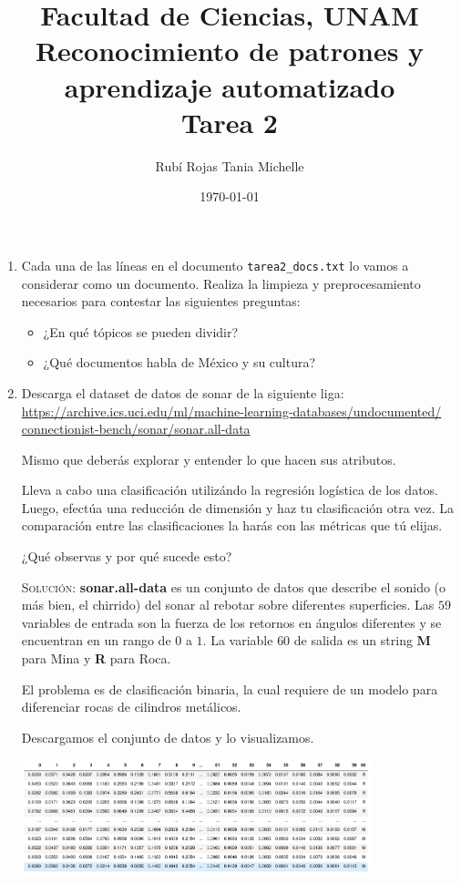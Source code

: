 \documentclass[letterpaper,11pt]{article}
\title{Facultad de Ciencias, UNAM \\ 
       Reconocimiento de patrones y aprendizaje automatizado \\ 
       Tarea 2}
\author{Rubí Rojas Tania Michelle}
\date{\today}
\begin{document}
\maketitle

\begin{enumerate}
    \item Cada una de las líneas en el documento \texttt{tarea2\_docs.txt} lo 
    vamos a considerar como un documento. Realiza la limpieza y preprocesamiento 
    necesarios para contestar las siguientes preguntas:
    \begin{itemize}
        \item ¿En qué tópicos se pueden dividir?

        \item ¿Qué documentos habla de México y su cultura?
    \end{itemize}

    \item Descarga el dataset de datos de sonar de la siguiente liga:
    \url{https://archive.ics.uci.edu/ml/machine-learning-databases/undocumented/
    connectionist-bench/sonar/sonar.all-data}

    Mismo que deberás explorar y entender lo que hacen sus atributos. 
    
    Lleva a cabo una clasificación utilizándo la regresión logística de los 
    datos. Luego, efectúa una reducción de dimensión y haz tu clasificación 
    otra vez. La comparación entre las clasificaciones la harás con las 
    métricas que tú elijas. 

    ¿Qué observas y por qué sucede esto?

    \textsc{Solución:} \textbf{sonar.all-data} es un conjunto de datos que 
    describe el sonido (o más bien, el chirrido) del sonar al rebotar sobre 
    diferentes superficies. Las $59$ variables de entrada son la fuerza de los 
    retornos en ángulos diferentes y se encuentran en un rango de $0$ a $1$. La 
    variable $60$ de salida es un string \textbf{M} para Mina y \textbf{R} para 
    Roca.

    El problema es de clasificación binaria, la cual requiere de un modelo para 
    diferenciar rocas de cilindros metálicos.

    Descargamos el conjunto de datos y lo visualizamos.
    \begin{center}
        \includegraphics[width=0.8\textwidth]{imagenes/sonar-dataset.png}
    \end{center}


\end{enumerate}
\end{document}

